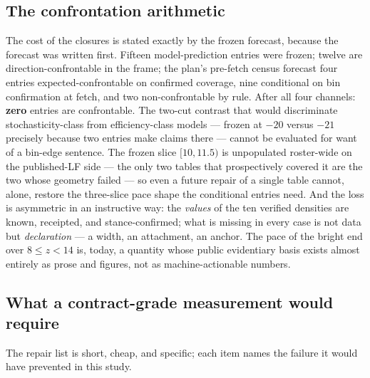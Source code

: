 \documentclass[twocolumn]{aastex702}
\begin{document}
\subsection{The confrontation arithmetic} \label{sec:gaparith}

The cost of the closures is stated exactly by the frozen forecast, because the forecast
was written first. Fifteen model-prediction entries were frozen; twelve are
direction-confrontable in the frame; the plan's pre-fetch census forecast four entries
expected-confrontable on confirmed coverage, nine conditional on bin confirmation at
fetch, and two non-confrontable by rule. After all four channels: \textbf{zero} entries
are confrontable. The two-cut contrast that would discriminate stochasticity-class from
efficiency-class models --- frozen at $-20$ versus $-21$ precisely because two entries
make claims there --- cannot be evaluated for want of a bin-edge sentence.
The frozen slice $[10,11.5)$ is unpopulated roster-wide on the published-LF side ---
the only two tables that prospectively covered it are the two whose geometry failed ---
so even a future repair of a single table cannot, alone, restore the three-slice pace
shape the conditional entries need. And the loss is asymmetric in an instructive way:
the \emph{values} of the ten verified \citet{weibel26} densities are known, receipted,
and stance-confirmed; what is missing in every case is not data but \emph{declaration}
--- a width, an attachment, an anchor. The pace of the bright end over $8\le z<14$ is,
today, a quantity whose public evidentiary basis exists almost entirely as prose and
figures, not as machine-actionable numbers.

\subsection{What a contract-grade measurement would require} \label{sec:gapreq}

The repair list is short, cheap, and specific; each item names the failure it would have
prevented in this study.
\end{document}

